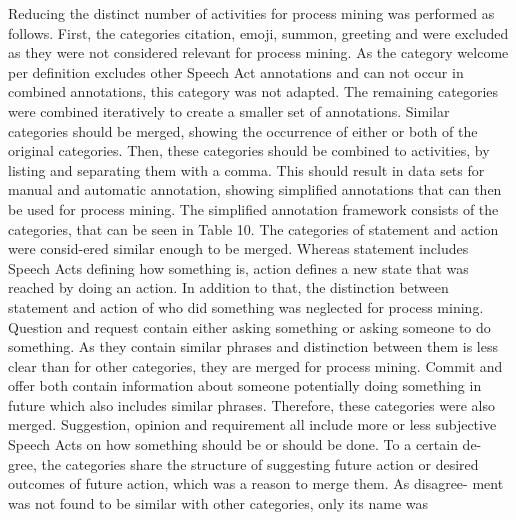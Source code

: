 Reducing the distinct number of activities for process mining was performed
as follows. First, the categories citation, emoji, summon, greeting and were
excluded as they were not considered relevant for process mining. As the
category welcome per definition excludes other Speech Act annotations and
can not occur in combined annotations, this category was not adapted.
The remaining categories were combined iteratively to create a smaller set
of annotations. Similar categories should be merged, showing the occurrence
of either or both of the original categories. Then, these categories should be
combined to activities, by listing and separating them with a comma. This
should result in data sets for manual and automatic annotation, showing
simplified annotations that can then be used for process mining.
The simplified annotation framework consists of the categories, that can
be seen in Table 10. The categories of statement and action were consid-ered similar enough to be merged. Whereas statement includes Speech Acts
defining how something is, action defines a new state that was reached by
doing an action. In addition to that, the distinction between statement and
action of who did something was neglected for process mining. Question and
request contain either asking something or asking someone to do something.
As they contain similar phrases and distinction between them is less clear
than for other categories, they are merged for process mining. Commit and
offer both contain information about someone potentially doing something in
future which also includes similar phrases. Therefore, these categories were
also merged.
Suggestion, opinion and requirement all include more or less subjective
Speech Acts on how something should be or should be done. To a certain de-
gree, the categories share the structure of suggesting future action or desired
outcomes of future action, which was a reason to merge them. As disagree-
ment was not found to be similar with other categories, only its name was

